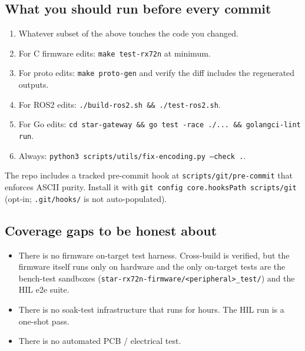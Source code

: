 \subsection{What you should run before every commit}

\begin{enumerate}
  \item Whatever subset of the above touches the code you changed.
  \item For C firmware edits: \texttt{make test-rx72n} at minimum.
  \item For proto edits: \texttt{make proto-gen} and verify the diff
        includes the regenerated outputs.
  \item For ROS2 edits: \texttt{./build-ros2.sh \&\& ./test-ros2.sh}.
  \item For Go edits: \texttt{cd star-gateway \&\& go test -race ./...
        \&\& golangci-lint run}.
  \item Always: \texttt{python3 scripts/utils/fix-encoding.py --check .}.
\end{enumerate}

The repo includes a tracked pre-commit hook at
\texttt{scripts/git/pre-commit} that enforces ASCII purity. Install it
with \texttt{git config core.hooksPath scripts/git} (opt-in;
\texttt{.git/hooks/} is not auto-populated).

\subsection{Coverage gaps to be honest about}

\begin{itemize}
  \item There is no firmware on-target test harness. Cross-build is
        verified, but the firmware itself runs only on hardware and
        the only on-target tests are the bench-test sandboxes
        (\texttt{star-rx72n-firmware/<peripheral>\_test/}) and the
        HIL e2e suite.
  \item There is no soak-test infrastructure that runs for hours.
        The HIL run is a one-shot pass.
  \item There is no automated PCB / electrical test.
\end{itemize}
